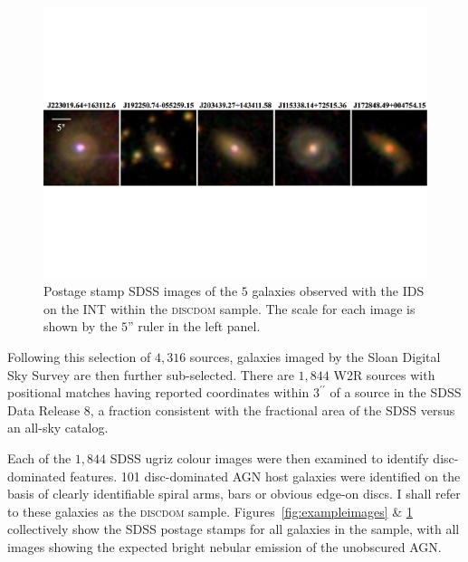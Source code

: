 \begin{figure}
\centering
\includegraphics[width=\textwidth]{agn/mosaic_INT_gal_only.pdf}
\caption[SDSS images of 5 galaxies observed with the IDS on the INT]{Postage stamp SDSS images of the $5$ galaxies observed with the IDS on the INT within the \textsc{discdom} sample. The scale for each image is shown by the $5$'' ruler in the left panel.}
\label{fig:INTimages}
\end{figure}


Following this selection of $4,316$ sources, galaxies imaged by the Sloan Digital Sky Survey are then further sub-selected. There are $1,844$ W2R sources with positional matches having reported coordinates within $3^{\prime \prime}$ of a source in the SDSS \citep{york00} Data Release 8, a fraction consistent with the fractional area of the SDSS versus an all-sky catalog. %

Each of the $1, 844$ SDSS ugriz colour images were then examined to identify disc-dominated features. 101 disc-dominated AGN host galaxies were identified on the basis of clearly identifiable spiral arms, bars or obvious edge-on discs. I shall refer to these galaxies as the \textsc{discdom} sample. Figures~\ref{fig:exampleimages} \& \ref{fig:INTimages} collectively show the SDSS postage stamps for all galaxies in the sample, with all images showing the expected bright nebular emission of the unobscured AGN. 

